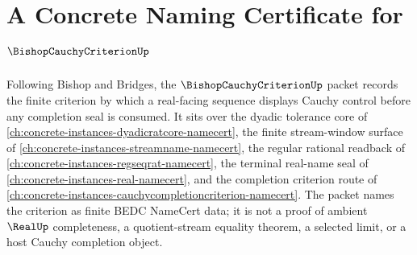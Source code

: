 \chapter{A Concrete Naming Certificate for $\BishopCauchyCriterionUp$}
\label{ch:concrete-instances-bishop-cauchy-criterion-namecert}

Following Bishop and Bridges, the $\BishopCauchyCriterionUp$ packet records the finite criterion by which a real-facing sequence displays Cauchy control before any completion seal is consumed. It sits over the dyadic tolerance core of \autoref{ch:concrete-instances-dyadicratcore-namecert}, the finite stream-window surface of \autoref{ch:concrete-instances-streamname-namecert}, the regular rational readback of \autoref{ch:concrete-instances-regseqrat-namecert}, the terminal real-name seal of \autoref{ch:concrete-instances-real-namecert}, and the completion criterion route of \autoref{ch:concrete-instances-cauchycompletioncriterion-namecert}. The packet names the criterion as finite BEDC NameCert data; it is not a proof of ambient $\RealUp$ completeness, a quotient-stream equality theorem, a selected limit, or a host Cauchy completion object.

